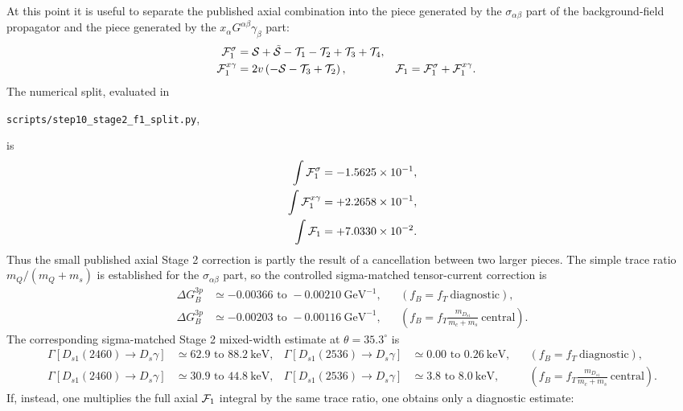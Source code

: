 \documentclass[11pt]{article}
\begin{document}
At this point it is useful to separate the published axial combination into the
piece generated by the $\sigma_{\alpha\beta}$ part of the background-field
propagator and the piece generated by the
$x_\alpha G^{\alpha\beta}\gamma_\beta$ part:
\begin{align}
  {\cal F}_1^{\sigma}
  &=
  {\cal S}+\tilde{\cal S}-{\cal T}_1-{\cal T}_2+{\cal T}_3+{\cal T}_4,\\
  {\cal F}_1^{x\gamma}
  &=
  2v\left(-{\cal S}-{\cal T}_3+{\cal T}_2\right),
  &
  {\cal F}_1&={\cal F}_1^{\sigma}+{\cal F}_1^{x\gamma}.
\end{align}
The numerical split, evaluated in
\begin{center}
  \texttt{scripts/step10\_stage2\_f1\_split.py},
\end{center}
is
\begin{align}
  \int{\cal F}_1^{\sigma}
  &=
  -1.5625\times 10^{-1},\\
  \int{\cal F}_1^{x\gamma}
  &=
  +2.2658\times 10^{-1},\\
  \int{\cal F}_1
  &=
  +7.0330\times 10^{-2}.
\end{align}
Thus the small published axial Stage 2 correction is partly the result of a
cancellation between two larger pieces.  The simple trace ratio
$m_Q/(m_Q+m_s)$ is established for the $\sigma_{\alpha\beta}$ part, so the
controlled sigma-matched tensor-current correction is
\begin{align}
  \Delta G_B^{3p}
  &\simeq -0.00366\text{ to }-0.00210\ \mathrm{GeV}^{-1},
  &&(f_B=f_T\ \text{diagnostic}),\\
  \Delta G_B^{3p}
  &\simeq -0.00203\text{ to }-0.00116\ \mathrm{GeV}^{-1},
  &&\left(f_B=f_T\frac{m_{D_{s1}}}{m_c+m_s}\ \text{central}\right).
\end{align}
The corresponding sigma-matched Stage 2 mixed-width estimate at
$\theta=35.3^\circ$ is
\begin{align}
  \Gamma[D_{s1}(2460)\to D_s\gamma]
  &\simeq 62.9\text{ to }88.2\ \mathrm{keV},
  &
  \Gamma[D_{s1}(2536)\to D_s\gamma]
  &\simeq 0.00\text{ to }0.26\ \mathrm{keV},
  &&(f_B=f_T\ \text{diagnostic}),\\
  \Gamma[D_{s1}(2460)\to D_s\gamma]
  &\simeq 30.9\text{ to }44.8\ \mathrm{keV},
  &
  \Gamma[D_{s1}(2536)\to D_s\gamma]
  &\simeq 3.8\text{ to }8.0\ \mathrm{keV},
  &&\left(f_B=f_T\frac{m_{D_{s1}}}{m_c+m_s}\ \text{central}\right).
\end{align}
If, instead, one multiplies the full axial ${\cal F}_1$ integral by the same
trace ratio, one obtains only a diagnostic estimate:
\end{document}
